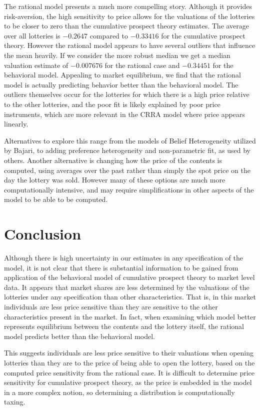 \documentclass[12pt]{paper}
\begin{document}
The rational model presents a much more compelling story. Although it
provides risk-aversion, the high sensitivity to price allows for the
valuations of the lotteries to be closer to zero than the cumulative
prospect theory estimates. The average over all lotteries is $-0.2647$
compared to $-0.33416$ for the cumulative prospect theory. However the
rational model appears to have several outliers that influence the
mean heavily. If we consider the more robust median we get a median
valuation estimate of $-0.007676$ for the rational case and $-0.34451$
for the behavioral model. Appealing to market equilibrium, we find that
the rational model is actually predicting behavior better than the
behavioral model. The outliers themselves occur for the lotteries for
which there is a high price relative to the other lotteries, and the
poor fit is likely explained by poor price instruments, which are more
relevant in the CRRA model where price appears linearly. 

Alternatives to explore this range from the models of Belief
Heterogeneity utilized by Bajari, to adding preference heterogeneity
and non-parametric fit, as used by others. Another alternative is
changing how the price of the contents is computed, using averages
over the past rather than simply the spot price on the day the lottery
was sold. However many of these options are much more computationally
intensive, and may require simplifications in other aspects of the
model to be able to be computed.

\section{Conclusion}

Although there is high uncertainty in our estimates in any
specification of the model, it is not clear that there is substantial
information to be gained from application of the behavioral model of
cumulative prospect theory to market level data. It appears that
market shares are less determined by the valuations of the lotteries
under any specification than other characteristics. That is, in this
market individuals are less price sensitive than they are sensitive to
the other characteristics present in the market. In fact, when
examining which model better represents equilibrium between the
contents and the lottery itself, the rational model predicts better
than the behavioral model.

This suggests individuals are less price sensitive to their valuations
when opening lotteries than they are to the price of being able to
open the lottery, based on the computed price sensitivity from the
rational case. It is difficult to determine price sensitivity for
cumulative prospect theory, as the price is embedded in the model in a
more complex notion, so determining a distribution is computationally
taxing. 
\end{document}
